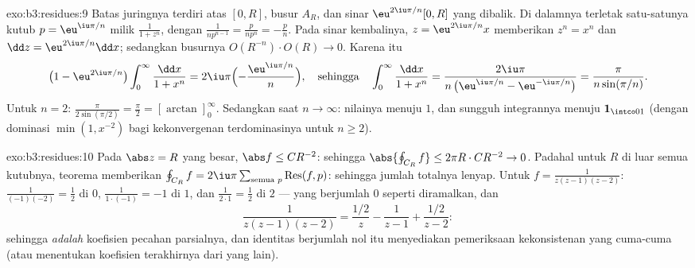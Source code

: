\begin{solution}{exo:b3:residues:9}
Batas juringnya terdiri atas $[0, R]$, busur $A_R$, dan
sinar $\eu^{2\iu\pi/n}[0, R]$ yang dibalik. Di dalamnya terletak
satu-satunya kutub $p = \eu^{\iu\pi/n}$ milik $\frac1{1+z^n}$, dengan
 $\frac1{np^{n-1}} = \frac{p}{np^n} = -\frac pn$. Pada
sinar kembalinya, $z = \eu^{2\iu\pi/n}x$ memberikan $z^n = x^n$ dan
$\dd z = \eu^{2\iu\pi/n}\dd x$; sedangkan busurnya
$O(R^{-n})\cdot O(R) \to 0$. Karena itu
\[
\bigl(1 - \eu^{2\iu\pi/n}\bigr)
\int_0^\infty\frac{\dd x}{1 + x^n}
= 2\iu\pi\Bigl(-\frac{\eu^{\iu\pi/n}}n\Bigr),
\quad\text{sehingga}\quad
\int_0^\infty\frac{\dd x}{1+x^n}
= \frac{2\iu\pi}{n\,\bigl(\eu^{\iu\pi/n} -
\eu^{-\iu\pi/n}\bigr)} = \frac{\pi}{n\sin(\pi/n)} .
\]
Untuk $n = 2$: $\frac\pi{2\sin(\pi/2)} = \frac\pi2 =
[\arctan]_0^\infty$. Sedangkan saat $n \to \infty$: nilainya menuju
$1$, dan sungguh integrannya menuju $\mathbf 1_{\intco01}$
(dengan dominasi $\min(1, x^{-2})$ bagi kekonvergenan terdominasinya untuk $n \geq 2$).
\end{solution}

\begin{solution}{exo:b3:residues:10}
Pada $\abs z = R$ yang besar, $\abs f \leq C R^{-2}$: sehingga $\abs{\oint_{C_R}
f} \leq 2\pi R\cdot CR^{-2} \to 0$. Padahal untuk $R$ di luar semua
kutubnya, teorema  memberikan $\oint_{C_R}f =
2\iu\pi\sum_{\text{semua }p}\operatorname{Res}(f, p)$: sehingga jumlah
totalnya lenyap. Untuk $f = \frac1{z(z-1)(z-2)}$: 
$\frac1{(-1)(-2)} = \frac12$ di $0$, $\frac1{1\cdot(-1)} = -1$
di $1$, dan $\frac1{2\cdot1} = \frac12$ di $2$ --- yang berjumlah $0$
seperti diramalkan, dan
\[
\frac1{z(z-1)(z-2)} = \frac{1/2}{z} - \frac1{z - 1} +
\frac{1/2}{z-2} :
\]
sehingga  \emph{adalah} koefisien pecahan parsialnya, dan
identitas berjumlah nol itu menyediakan pemeriksaan kekonsistenan yang cuma-cuma (atau
menentukan koefisien terakhirnya dari yang lain).
\end{solution}

